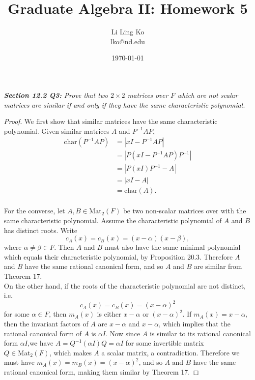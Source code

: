 \documentclass{article}
\begin{document}
\title{Graduate Algebra II: Homework 5}
\author{Li Ling Ko\\ lko@nd.edu}
\date{\today}
\maketitle

\it \textbf{Section 12.2 Q3:} Prove that two $2\times2$ matrices over $F$
  which are not scalar matrices are similar if and only if they have the
  same characteristic polynomial.
  \begin{proof}
    We first show that similar matrices have the same characteristic
    polynomial. Given similar matrices $A$ and $P^{-1}AP$,
    \begin{align*}
      \text{char}(P^{-1}AP) &=|xI-P^{-1}AP|\\
      &=|P(xI-P^{-1}AP)P^{-1}|\\
      &=|P(xI)P^{-1}-A|\\
      &=|xI-A|\\
      &=\text{char}(A).\\
    \end{align*}

    For the converse, let $A,B\in\text{Mat}_2(F)$ be two non-scalar
    matrices over with the same characteristic polynomial. Assume the
    characteristic polynomial of $A$ and $B$ has distinct roots. Write
    \[c_A(x) =c_B(x) =(x-\alpha)(x-\beta),\]
    where $\alpha\neq\beta\in F$.
    Then $A$ and $B$ must also have the same minimal polynomial which
    equals their characteristic polynomial, by Proposition 20.3. Therefore
    $A$ and $B$ have the same rational canonical form, and so $A$ and $B$
    are similar from Theorem 17.\\

    On the other hand, if the roots of the characteristic polynomial are
    not distinct, i.e.
    \[c_A(x)=c_B(x)=(x-\alpha)^2\]
    for some $\alpha\in F$, then $m_A(x)$ is either $x-\alpha$ or
    $(x-\alpha)^2$. If $m_A(x)=x-\alpha$, then the invariant factors of $A$
    are $x-\alpha$ and $x-\alpha$, which implies that the rational
    canonical form of $A$ is $\alpha I$. Now since $A$ is similar to its
    rational canonical form $\alpha I$,we have $A=Q^{-1}(\alpha I)Q=\alpha
    I$ for some invertible matrix $Q\in\text{Mat}_2(F)$, which makes $A$ a
    scalar matrix, a contradiction. Therefore we must have
    $m_A(x)=m_B(x)=(x-\alpha)^2$, and so $A$ and $B$ have the same rational
    canonical form, making them similar by Theorem 17.
  \end{proof}
\end{document}
